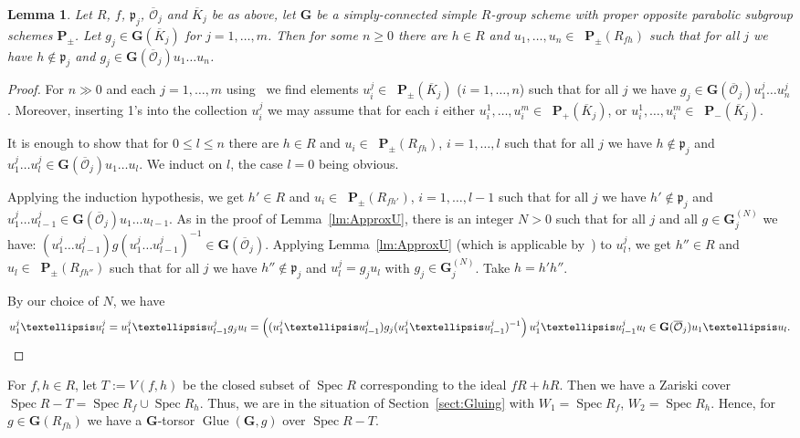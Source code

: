\documentclass[11pt]{amsart}
\DeclareMathOperator\Ru{R_u}
\DeclareMathOperator\Glue{{Glue}}
\DeclareMathOperator\Spec{{Spec}}
\theoremstyle{plain}
\newtheorem{lemma}[proposition]{Lemma}
\theoremstyle{definition}
\theoremstyle{remark}
\newcommand\fp{{\mathfrak{p}}}
\newcommand\cO{{\mathcal{O}}}
\newcommand\bG{{\mathbf G}}
\newcommand\bP{{\mathbf P}}
\begin{document}
\begin{lemma}\label{lm:ApproxG}
  Let $R$, $f$, $\fp_j$, $\overline\cO_j$ and $\overline K_j$ be as above, let $\bG$ be a simply-connected simple $R$-group scheme with proper opposite parabolic subgroup schemes $\bP_\pm$. Let $g_j\in\bG(\overline K_j)$ for $j=1,\ldots,m$. Then for some $n\ge0$ there are $h\in R$ and $u_1,\ldots,u_n\in \Ru\bP_\pm(R_{fh})$ such that for all $j$ we have $h\notin\fp_j$ and $g_j\in\bG(\overline\cO_j) u_1\ldots u_n$.
\end{lemma}
\begin{proof}
For $n\gg0$ and each $j=1,\ldots,m$ using~\cite[fait~4.3(2), lemme~4.5(1)]{Gille:BourbakiTalk} we find elements $u^j_i\in \Ru\bP_\pm(\overline K_j)$ ($i=1,\ldots,n$) such that for all $j$ we have $g_j\in\bG(\overline\cO_j) u^j_1\ldots u^j_n$. Moreover, inserting 1's into the collection $u^j_i$ we may assume that for each $i$ either $u^1_i,\ldots,u^m_i\in\Ru\bP_+(\overline K_j)$, or $u^1_i,\ldots,u^m_i\in\Ru\bP_-(\overline K_j)$.

It is enough to show that for $0\le l\le n$ there are $h\in R$ and $u_i\in \Ru\bP_\pm(R_{fh})$, $i=1,\dots,l$ such that for all $j$ we have $h\notin\fp_j$ and $u^j_1\ldots u^j_l\in\bG(\overline\cO_j)u_1\ldots u_l$. We induct on $l$, the case $l=0$ being obvious.

Applying the induction hypothesis, we get $h'\in R$ and $u_i\in \Ru\bP_\pm(R_{fh'})$, $i=1,\dots,l-1$ such that for all $j$ we have $h'\notin\fp_j$ and $u^j_1\ldots u^j_{l-1}\in\bG(\overline\cO_j)u_1\ldots u_{l-1}$. As in the proof of Lemma~\ref{lm:ApproxU}, there is an integer $N>0$ such that for all $j$ and all $g\in\bG_j^{(N)}$ we have: $(u^j_1\ldots u^j_{l-1})g(u^j_1\ldots u^j_{l-1})^{-1}\in\bG(\overline\cO_j)$. Applying Lemma~\ref{lm:ApproxU} (which is applicable by~\cite[exp.~XXVI, prop.~2.1]{SGA3-3}) to $u^j_l$, we get $h''\in R$ and $u_l\in \Ru\bP_\pm(R_{fh''})$ such that for all $j$ we have $h''\notin\fp_j$ and $u^j_l=g_ju_l$ with $g_j\in\bG_j^{(N)}$. Take $h=h'h''$.

By our choice of $N$, we have
    \[
        u^j_1\ldots u^j_l=u^j_1\ldots u^j_{l-1}g_ju_l=\left((u^j_1\ldots u^j_{l-1})g_j(u^j_1\ldots u^j_{l-1})^{-1}\right)
        u^j_1\ldots u^j_{l-1}u_l\in\bG(\overline\cO_j)u_1\ldots u_l.
    \qedhere\]
\end{proof}

For $f,h\in R$, let $T:=V(f,h)$ be the closed subset of $\Spec R$ corresponding to the ideal $fR+hR$. Then we have a Zariski cover $\Spec R-T=\Spec R_f\cup\Spec R_h$. Thus, we are in the situation of Section~\ref{sect:Gluing} with $W_1=\Spec R_f$, $W_2=\Spec R_h$. Hence, for $g\in\bG(R_{fh})$ we have a $\bG$-torsor $\Glue(\bG,g)$ over $\Spec R-T$.
\end{document}
